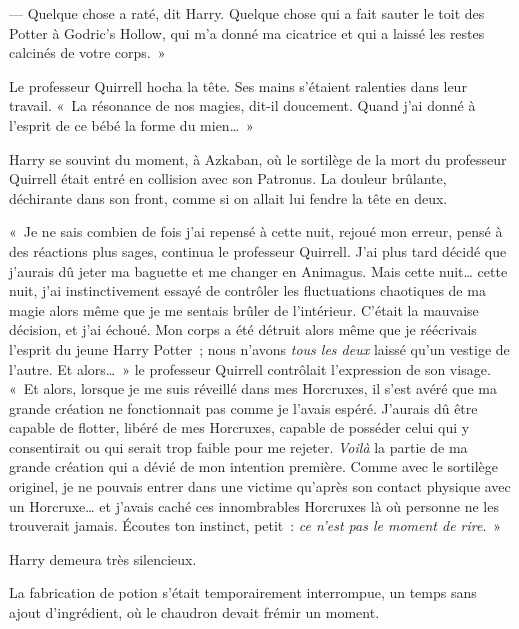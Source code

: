 --- Quelque chose a raté, dit Harry. Quelque chose qui a fait sauter le toit des Potter à Godric's Hollow, qui m'a donné ma cicatrice et qui a laissé les restes calcinés de votre corps.~»

Le professeur Quirrell hocha la tête. Ses mains s'étaient ralenties dans leur travail. «~La résonance de nos magies, dit-il doucement. Quand j'ai donné à l'esprit de ce bébé la forme du mien…~»

Harry se souvint du moment, à Azkaban, où le sortilège de la mort du professeur Quirrell était entré en collision avec son Patronus. La douleur brûlante, déchirante dans son front, comme si on allait lui fendre la tête en deux.

«~Je ne sais combien de fois j'ai repensé à cette nuit, rejoué mon erreur, pensé à des réactions plus sages, continua le professeur Quirrell. J'ai plus tard décidé que j'aurais dû jeter ma baguette et me changer en Animagus. Mais cette nuit… cette nuit, j'ai instinctivement essayé de contrôler les fluctuations chaotiques de ma magie alors même que je me sentais brûler de l'intérieur. C'était la mauvaise décision, et j'ai échoué. Mon corps a été détruit alors même que je réécrivais l'esprit du jeune Harry Potter~; nous n'avons \emph{tous les deux} laissé qu'un vestige de l'autre. Et alors…~» le professeur Quirrell contrôlait l'expression de son visage. «~Et alors, lorsque je me suis réveillé dans mes Horcruxes, il s'est avéré que ma grande création ne fonctionnait pas comme je l'avais espéré. J'aurais dû être capable de flotter, libéré de mes Horcruxes, capable de posséder celui qui y consentirait ou qui serait trop faible pour me rejeter. \emph{Voilà} la partie de ma grande création qui a dévié de mon intention première. Comme avec le sortilège originel, je ne pouvais entrer dans une victime qu'après son contact physique avec un Horcruxe… et j'avais caché ces innombrables Horcruxes là où personne ne les trouverait jamais. Écoutes ton instinct, petit~: \emph{ce n'est pas le moment de rire}.~»

Harry demeura très silencieux.

La fabrication de potion s'était temporairement interrompue, un temps sans ajout d'ingrédient, où le chaudron devait frémir un moment.


